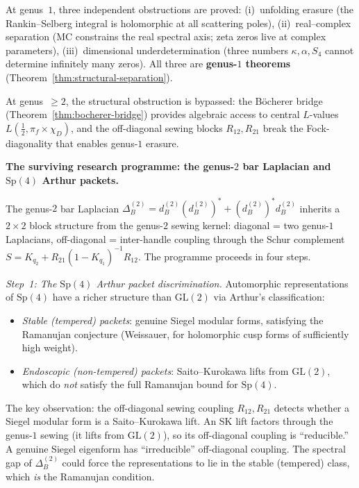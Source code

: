 \documentclass[11pt]{article}
\begin{document}
At genus~$1$, three independent obstructions are proved:
(i)~unfolding erasure (the Rankin--Selberg integral is
holomorphic at all scattering poles),
(ii)~real--complex separation (MC constrains the real spectral
axis; zeta zeros live at complex parameters),
(iii)~dimensional underdetermination (three numbers
$\kappa, \alpha, S_4$ cannot determine infinitely many zeros).
All three are \textbf{genus-$1$ theorems}
(Theorem~\ref{thm:structural-separation}).

At genus~$\geq 2$, the structural obstruction is bypassed:
the B\"ocherer bridge
(Theorem~\ref{thm:bocherer-bridge})
provides algebraic access to central $L$-values
$L(\tfrac{1}{2}, \pi_f \times \chi_D)$, and the off-diagonal
sewing blocks $R_{12}, R_{21}$ break the Fock-diagonality that
enables genus-$1$ erasure.

\textbf{The surviving research programme: the genus-$2$ bar
Laplacian and $\mathrm{Sp}(4)$ Arthur packets.}

The genus-$2$ bar Laplacian
$\Delta_B^{(2)} = d_B^{(2)}(d_B^{(2)})^*
+ (d_B^{(2)})^* d_B^{(2)}$
inherits a $2 \times 2$ block structure from the genus-$2$
sewing kernel: diagonal = two genus-$1$ Laplacians,
off-diagonal = inter-handle coupling through the Schur
complement $S = K_{q_2} + R_{21}(1 - K_{q_1})^{-1}R_{12}$.
The programme proceeds in four steps.

\emph{Step~1: The $\mathrm{Sp}(4)$ Arthur packet
discrimination.}
Automorphic representations of $\mathrm{Sp}(4)$ have a
richer structure than $\mathrm{GL}(2)$ via Arthur's
classification:
\begin{itemize}[nosep]
\item \emph{Stable (tempered) packets}: genuine Siegel
  modular forms, satisfying the Ramanujan conjecture
  (Weissauer, for holomorphic cusp forms of sufficiently
  high weight).
\item \emph{Endoscopic (non-tempered) packets}:
  Saito--Kurokawa lifts from $\mathrm{GL}(2)$, which do
  \emph{not} satisfy the full Ramanujan bound for
  $\mathrm{Sp}(4)$.
\end{itemize}
The key observation: the off-diagonal sewing coupling
$R_{12}, R_{21}$ detects whether a Siegel modular form is
a Saito--Kurokawa lift.  An SK lift factors through the
genus-$1$ sewing (it lifts from $\mathrm{GL}(2)$), so its
off-diagonal coupling is ``reducible.''  A genuine Siegel
eigenform has ``irreducible'' off-diagonal coupling.  The
spectral gap of $\Delta_B^{(2)}$ could force the
representations to lie in the stable (tempered) class,
which \emph{is} the Ramanujan condition.
\end{document}
